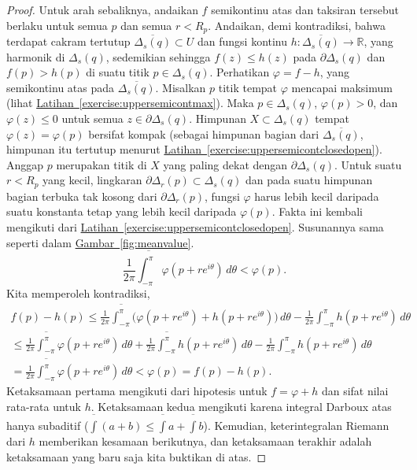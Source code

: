 \documentclass[12pt,openany]{book}
\newcommand{\R}{{\mathbb{R}}}
\theoremstyle{plain}
\theoremstyle{remark}
\theoremstyle{definition}
\theoremstyle{exercise}
\theoremstyle{example}
\newcommand{\figureref}[1]{\hyperref[#1]{Gambar~\ref*{#1}}}
\newcommand{\exerciseref}[1]{\hyperref[#1]{Latihan~\ref*{#1}}}
\begin{document}
\begin{proof}
Untuk arah sebaliknya,
andaikan $f$ semikontinu atas dan
taksiran tersebut berlaku untuk semua $p$ dan semua $r < R_p$.
Andaikan, demi kontradiksi, bahwa
terdapat cakram tertutup 
$\overline{\Delta_s(q)} \subset U$ dan fungsi kontinu
$h \colon \overline{\Delta_s(q)} \to \R$, yang harmonik di $\Delta_s(q)$,
sedemikian sehingga $f(z) \leq h(z)$ pada $\partial \Delta_s(q)$ dan
$f(p) > h(p)$ di suatu titik $p \in \Delta_s(q)$.
Perhatikan $\varphi = f-h$, yang semikontinu atas
pada $\overline{\Delta_s(q)}$.
Misalkan $p$ titik tempat $\varphi$ mencapai maksimum 
(lihat \exerciseref{exercise:uppersemicontmax}).
Maka $p \in \Delta_s(q)$,
$\varphi(p) > 0$, dan $\varphi(z) \leq 0$
untuk semua $z \in \partial \Delta_s(q)$.  Himpunan
$X \subset \Delta_s(q)$ tempat $\varphi(z) = \varphi(p)$ bersifat kompak
(sebagai himpunan bagian dari $\overline{\Delta_s(q)}$, himpunan itu tertutup menurut
\exerciseref{exercise:uppersemicontclosedopen}).
Anggap $p$ merupakan titik di $X$ yang paling dekat dengan
$\partial \Delta_s(q)$.
Untuk suatu $r < R_p$ yang kecil, lingkaran
$\partial \Delta_r(p) \subset \Delta_s(q)$ dan pada suatu himpunan bagian terbuka tak kosong
dari $\partial \Delta_r(p)$, fungsi $\varphi$ harus lebih kecil daripada suatu konstanta tetap
yang lebih kecil daripada $\varphi(p)$.  Fakta ini kembali mengikuti dari 
\exerciseref{exercise:uppersemicontclosedopen}.
Susunannya sama seperti dalam \figureref{fig:meanvalue}.
\begin{equation*}
\frac{1}{2\pi} \overline{\int_{-\pi}^{\pi}} \varphi(p+re^{i\theta})\, d\theta <
\varphi(p) .
\end{equation*}
Kita memperoleh
kontradiksi,
\begin{multline*}
f(p)-h(p)
\leq
\frac{1}{2\pi} \overline{\int_{-\pi}^{\pi}}
\bigl( \varphi(p+re^{i\theta}) +
h(p+re^{i\theta}) \bigr)
\, d\theta
-
\frac{1}{2\pi} \int_{-\pi}^{\pi} h(p+re^{i\theta}) \, d\theta
\\
\leq
\frac{1}{2\pi} \overline{\int_{-\pi}^{\pi}}
\varphi(p+re^{i\theta})
\, d\theta
+
\frac{1}{2\pi} \overline{\int_{-\pi}^{\pi}}
h(p+re^{i\theta})
\, d\theta
-
\frac{1}{2\pi} \int_{-\pi}^{\pi} h(p+re^{i\theta}) \, d\theta
\\
=
\frac{1}{2\pi} \overline{\int_{-\pi}^{\pi}} \varphi(p+re^{i\theta})\, d\theta <
\varphi(p) =
f(p)-h(p) .
\end{multline*}
Ketaksamaan pertama mengikuti dari hipotesis untuk
$f=\varphi+h$ dan sifat nilai rata-rata
untuk $h$.  Ketaksamaan kedua
mengikuti karena integral Darboux atas
hanya subaditif ($\overline{\int} (a+b) \leq \overline{\int}a +
\overline{\int} b$).  Kemudian, keterintegralan Riemann dari $h$ memberikan
kesamaan berikutnya, dan ketaksamaan terakhir adalah ketaksamaan yang baru saja kita buktikan di atas.
\end{proof}
\end{document}
